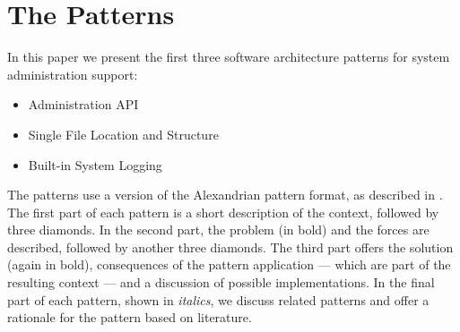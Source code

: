 \section{The Patterns}

In this paper we present the first three software architecture patterns for system administration support: 
\begin{itemize} 
	\item {\sc Administration API}
	\item {\sc Single File Location and Structure}
	\item {\sc Built-in System Logging}
\end{itemize}

The patterns use a version of the Alexandrian pattern format, as described in \cite{alexander1977}. The first part of each pattern is a short description of the context, followed by three diamonds. In the second part, the problem (in bold) and the forces are described, followed by another three diamonds. The third part offers the solution (again in bold), consequences of the pattern application --- which are part of the resulting context --- and a discussion of possible implementations. In the final part of each pattern, shown in \textit{italics}, we discuss related patterns and offer a rationale for the pattern based on literature.
